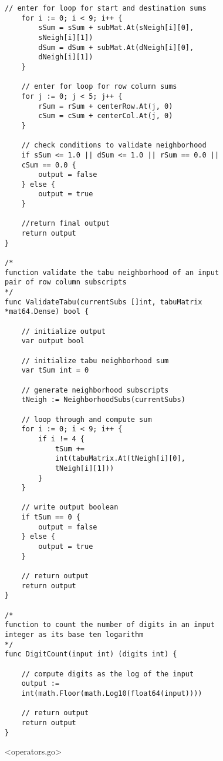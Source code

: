 \begin{lstlisting}[basicstyle=\small]
	// enter for loop for start and destination sums
	for i := 0; i < 9; i++ {
		sSum = sSum + subMat.At(sNeigh[i][0], 
		sNeigh[i][1])
		dSum = dSum + subMat.At(dNeigh[i][0], 
		dNeigh[i][1])
	}

	// enter for loop for row column sums
	for j := 0; j < 5; j++ {
		rSum = rSum + centerRow.At(j, 0)
		cSum = cSum + centerCol.At(j, 0)
	}

	// check conditions to validate neighborhood
	if sSum <= 1.0 || dSum <= 1.0 || rSum == 0.0 || 
	cSum == 0.0 {
		output = false
	} else {
		output = true
	}

	//return final output
	return output
}

/* 
function validate the tabu neighborhood of an input 
pair of row column subscripts
*/
func ValidateTabu(currentSubs []int, tabuMatrix 
*mat64.Dense) bool {

	// initialize output
	var output bool

	// initialize tabu neighborhood sum
	var tSum int = 0

	// generate neighborhood subscripts
	tNeigh := NeighborhoodSubs(currentSubs)

	// loop through and compute sum
	for i := 0; i < 9; i++ {
		if i != 4 {
			tSum += 
			int(tabuMatrix.At(tNeigh[i][0], 
			tNeigh[i][1]))
		}
	}

	// write output boolean
	if tSum == 0 {
		output = false
	} else {
		output = true
	}

	// return output
	return output
}

/* 
function to count the number of digits in an input 
integer as its base ten logarithm
*/
func DigitCount(input int) (digits int) {

	// compute digits as the log of the input
	output := 
	int(math.Floor(math.Log10(float64(input))))

	// return output
	return output
}

\end{lstlisting}

\newpage

<operators.go>


